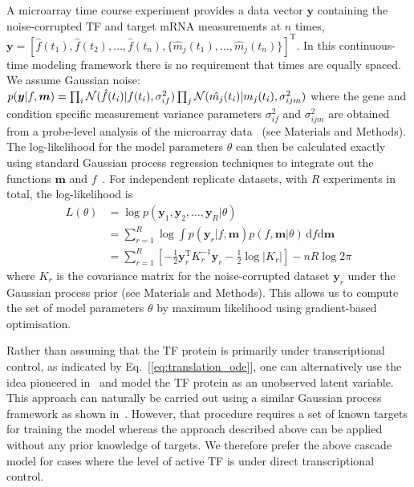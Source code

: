 \documentclass{pnastwo}
\begin{document}
\begin{article}
A microarray time course experiment provides a data vector $\bm y$ containing the noise-corrupted TF and target mRNA
measurements at $n$ times,
$\bm
y=[\hat{f}(t_1),\hat{f}(t_2),\ldots,\hat{f}(t_n),\{\hat{m}_j(t_1),\ldots,\hat{m}_j(t_n)\}]^\mathrm{T}$.
In this continuous-time modeling framework there is no
requirement that times are equally spaced. We assume Gaussian noise:
$p(\bm y|f,\bm m)=\prod_i{\cal
  N}(\hat{f}(t_i)|f(t_i),\sigma_{if}^2)\prod_j{\cal
  N}(\hat{m_j}(t_i)|m_j(t_i),\sigma_{ijm}^2)$ where the gene and condition
specific measurement variance parameters $\sigma_{if}^2$ and
$\sigma_{ijm}^2$ are obtained from a probe-level analysis of the
microarray data~\cite{Liu2005,Pearson2009} (see
Materials and Methods). The log-likelihood for the model parameters
$\theta$ can then be calculated exactly using standard Gaussian process regression
techniques to integrate out the functions $\bm m$ and
$f$~\cite{Rasmussen2006}. For independent replicate datasets, with
$R$ experiments in total, the
log-likelihood is
\begin{equation*}
  \begin{split}
    L(\theta) & = \log p(\bm y_1,\bm y_2,\ldots,\bm y_{R}|\theta) \\
    & = \sum_{r=1}^{R} \log \!\int 
    \!\!p(\bm y_r|f,\bm m)p(f,\bm m|\theta) \, \mathrm{d}\!f\mathrm{d}\bm m\\
    & = \sum_{r=1}^{R} \left[-\frac{1}{2}\bm y_r^\mathrm{T} K_r^{-1} \bm y_r -
      \frac{1}{2}\log|K_r|\right] -nR\log 2\pi
  \end{split}
\end{equation*}
where $K_r$ is the covariance matrix for the
noise-corrupted dataset $\bm y_r$ under the Gaussian process prior (see
Materials and Methods). This allows us to compute the set of model
parameters $\theta$ by maximum
likelihood using gradient-based optimisation. 

Rather than assuming that the TF protein is primarily under
transcriptional control, as indicated by
Eq.~[\ref{eq:translation_ode}], one can alternatively use the idea pioneered
in~\cite{Barenco2006a,Khanin2006} and model the TF protein as an unobserved
latent variable. This approach can naturally be carried out using a
similar Gaussian process framework as shown in~\cite{Gao2008}. However, that procedure requires a set of known
targets for training the model whereas the approach described above
can be applied without any prior knowledge of targets. We therefore
prefer the above cascade model for cases where the level of active TF is under direct transcriptional control. 


\end{article}
\end{document}

